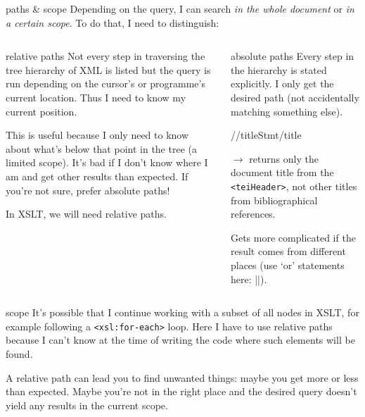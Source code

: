\begin{frame}{paths \& scope}
\small 
Depending on the query, I can search \emph{in the whole document} or \emph{in a certain scope}. To do that, I need to distinguish:

\begin{columns}
\begin{block}{relative paths}\footnotesize
Not every step in traversing the tree hierarchy of XML is listed but the query is run depending on the cursor's or programme's current location. Thus I need to know my current position. 

This is useful because I only need to know about what's below that point in the tree (a limited scope). It's bad if I don't know where I am and get other results than expected. If you're not sure, prefer absolute paths!

In XSLT, we will need relative paths.
\end{block}

\begin{block}{absolute paths}\footnotesize
Every step in the hierarchy is stated explicitly. I only get the desired path (not accidentally matching something else).
\begin{xmlcode}
//titleStmt/title
\end{xmlcode}
$\to$ returns only the document title from the \texttt{<teiHeader>}, not other titles from bibliographical references.

Gets more complicated if the result comes from different places (use `or' statements here: ||).
\end{block}
\end{columns}

\framebreak 

\begin{block}{scope}\footnotesize
It's possible that I continue working with a subset of all nodes in XSLT, for example following a \texttt{<xsl:for-each>} loop. Here I have to use relative paths because I can't know at the time of writing the code where such elements will be found. 
\smallskip

A relative path can lead you to find unwanted things: maybe you get more or less than expected. Maybe you're not in the right place and the desired query doesn't yield any results in the current scope. 
\end{block}


\end{frame}


